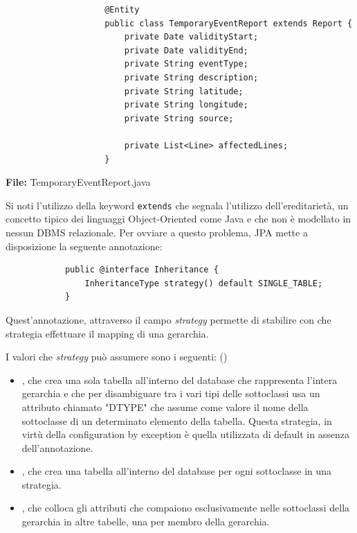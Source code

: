        \begin{framed}
            \begin{code}
                \begin{verbatim}
                    @Entity
                    public class TemporaryEventReport extends Report {        
                        private Date validityStart;
                        private Date validityEnd;
                        private String eventType;
                        private String description;
                        private String latitude;
                        private String longitude;
                        private String source;

                        private List<Line> affectedLines;
                    }
                \end{verbatim}  
                \caption{\textbf{File:} TemporaryEventReport.java}
            \end{code}
        \end{framed}
        
        Si noti l'utilizzo della keyword \texttt{extends} che segnala l'utilizzo dell'ereditarietà, un concetto tipico dei linguaggi Object-Oriented come Java e che non è modellato in nessun DBMS relazionale. Per ovviare a questo problema, JPA mette a disposizione la seguente annotazione: 

        \begin{verbatim}
            public @interface Inheritance {
                InheritanceType strategy() default SINGLE_TABLE;
            }
        \end{verbatim}

        Quest'annotazione, attraverso il campo \textit{strategy} permette di stabilire con che strategia effettuare il mapping di una gerarchia.

        I valori che \textit{strategy} può assumere sono i seguenti: (\cite{jee7})

        \begin{itemize}
            \item {}, che crea una sola tabella all'interno del database che rappresenta l'intera gerarchia e che per disambiguare tra i vari tipi delle sottoclassi usa un attributo chiamato "DTYPE" che assume come valore il nome della sottoclasse di un determinato elemento della tabella. Questa strategia, in virtù della configuration by exception è quella utilizzata di default in assenza dell'annotazione.
            \item {}, che crea una tabella all'interno del database per ogni sottoclasse in una strategia.
            \item {}, che colloca gli attributi che compaiono esclusivamente nelle sottoclassi della gerarchia in altre tabelle, una per membro della gerarchia.
        \end{itemize}

